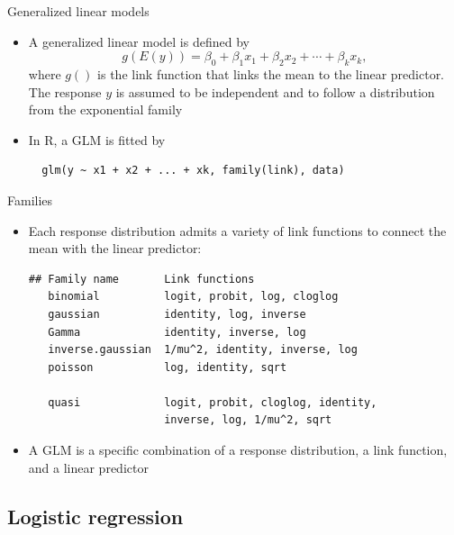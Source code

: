\documentclass[aspectratio=169]{beamer}
\begin{document}
\begin{frame}[fragile]{Generalized linear models}
  \begin{itemize}
    \item A generalized linear model is defined by
\[
  g(E(y)) = \beta_0 + \beta_1 x_1 + \beta_2 x_2 + \cdots + \beta_k x_k,
\]
where $g()$ is the link function that links the mean to the linear predictor.
The response $y$ is assumed to be independent and to follow a distribution
from the exponential family

\item In R, a GLM is fitted by

  \begin{lstlisting}
  glm(y ~ x1 + x2 + ... + xk, family(link), data)
\end{lstlisting}
  \end{itemize}
\end{frame}

\begin{frame}[fragile]{Families}
  \begin{itemize}
    \item Each response distribution admits a variety of link functions to
      connect the mean with the linear predictor:

  \begin{lstlisting}
## Family name       Link functions
   binomial          logit, probit, log, cloglog
   gaussian          identity, log, inverse
   Gamma             identity, inverse, log
   inverse.gaussian  1/mu^2, identity, inverse, log
   poisson           log, identity, sqrt

   quasi             logit, probit, cloglog, identity,
                     inverse, log, 1/mu^2, sqrt
\end{lstlisting}
\item A GLM is a specific combination of a response distribution, a link
  function, and a linear predictor
  \end{itemize}
\end{frame}

\subsection{Logistic regression}
\end{document}
